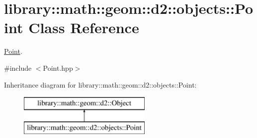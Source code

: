 \hypertarget{classlibrary_1_1math_1_1geom_1_1d2_1_1objects_1_1_point}{}\section{library\+:\+:math\+:\+:geom\+:\+:d2\+:\+:objects\+:\+:Point Class Reference}
\label{classlibrary_1_1math_1_1geom_1_1d2_1_1objects_1_1_point}


\hyperlink{classlibrary_1_1math_1_1geom_1_1d2_1_1objects_1_1_point}{Point}.  




{\ttfamily \#include $<$Point.\+hpp$>$}

Inheritance diagram for library\+:\+:math\+:\+:geom\+:\+:d2\+:\+:objects\+:\+:Point\+:\begin{figure}[H]
\begin{center}
\leavevmode
\includegraphics[height=2.000000cm]{classlibrary_1_1math_1_1geom_1_1d2_1_1objects_1_1_point}
\end{center}
\end{figure}
